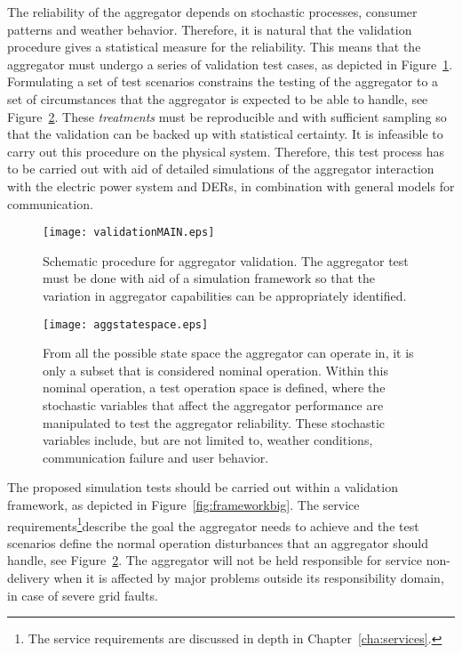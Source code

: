 The reliability of the aggregator depends on stochastic processes, \eg consumer patterns and weather behavior. Therefore, it is natural that the validation procedure gives a statistical measure for the reliability. This means that the aggregator must undergo a series of validation test cases, as depicted in Figure~\ref{fig:MAINframework}. Formulating a set of test scenarios constrains the testing of the aggregator to a set of circumstances that the aggregator is expected to be able to handle, see Figure~\ref{fig:aggstatespace}. These \emph{treatments} must be reproducible and with sufficient sampling so that the validation can be backed up with statistical certainty. It is infeasible to carry out this procedure on the physical system. Therefore, this test process has to be carried out with aid of detailed simulations of the aggregator interaction with the electric power system and DERs, in combination with general models for communication.
\begin{figure}[htbp!]
\centering
\texttt{[image: validationMAIN.eps]}
\caption{Schematic procedure for aggregator validation. The aggregator test must be done with aid of a simulation framework so that the variation in aggregator capabilities can be appropriately identified.}
\label{fig:MAINframework}
\end{figure}

\begin{figure}[hpb!]
\centering
\texttt{[image: aggstatespace.eps]}
\caption{From all the possible state space the aggregator can operate in, it is only a subset that is considered nominal operation. Within this nominal operation, a test operation space is defined, where the stochastic variables that affect the aggregator performance are manipulated to test the aggregator reliability. These stochastic variables include, but are not limited to, weather conditions, communication failure and user behavior.}
\label{fig:aggstatespace}
\end{figure}

The proposed simulation tests should be carried out within a validation framework, as depicted in Figure~\ref{fig:frameworkbig}. The service requirements\footnote{The service requirements are discussed in depth in Chapter~\ref{cha:services}.}describe the goal the aggregator needs to achieve and the test scenarios define the normal operation disturbances that an aggregator should handle, see Figure~\ref{fig:aggstatespace}. The aggregator will not be held responsible for service non-delivery when it is affected by major problems outside its responsibility domain, \eg in case of severe grid faults. %

